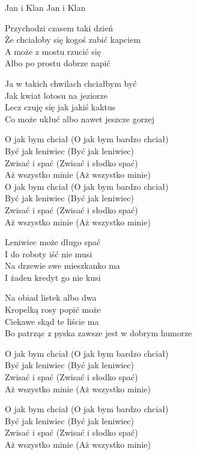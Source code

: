 {Jan i Klan}
{Jan i Klan}
\begin{text}
Przychodzi czasem taki dzień\\
Że chciałoby się kogoś zabić kapciem\\
A może z mostu rzucić się\\
Albo po prostu dobrze napić

Ja w takich chwilach chciałbym być\\
Jak kwiat lotosu na jeziorze\\
Lecz czuję się jak jakiś kaktus\\
Co może ukłuć albo nawet jeszcze gorzej

O jak bym chciał (O jak bym bardzo chciał)\\
Być jak leniwiec (Być jak leniwiec)\\
Zwisać i spać (Zwisać i słodko spać)\\
Aż wszystko minie (Aż wszystko minie)\\

O jak bym chciał (O jak bym bardzo chciał)\\
Być jak leniwiec (Być jak leniwiec)\\
Zwisać i spać (Zwisać i słodko spać)\\
Aż wszystko minie (Aż wszystko minie)

Leniwiec może długo spać\\
I do roboty iść nie musi\\
Na drzewie swe mieszkanko ma\\
I żaden kredyt go nie kusi

Na obiad listek albo dwa\\
Kropelką rosy popić może\\
Ciekawe skąd te liście ma\\
Bo patrząc z pyska zawsze jest w dobrym humorze

O jak bym chciał (O jak bym bardzo chciał)\\
Być jak leniwiec (Być jak leniwiec)\\
Zwisać i spać (Zwisać i słodko spać)\\
Aż wszystko minie (Aż wszystko minie)

O jak bym chciał (O jak bym bardzo chciał)\\
Być jak leniwiec (Być jak leniwiec)\\
Zwisać i spać (Zwisać i słodko spać)\\
Aż wszystko minie (Aż wszystko minie)


\end{text}
